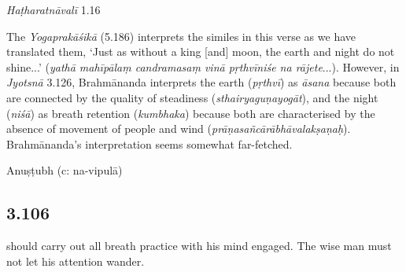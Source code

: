 \begin{ekdosis}


\begin{testimonia}[hp03_105]
\emph{Haṭharatnāvalī} 1.16
\begin{versinnote}
\end{versinnote}

\end{testimonia}

\begin{philcomm}[hp03_105]
The \emph{Yogaprakāśikā} (5.186) interprets the similes in this verse as we have translated them, `Just as without a king [and] moon, the earth and night do not shine...' (\emph{yathā mahīpālaṃ candramasaṃ vinā pṛthvīniśe na rājete}...). However, in \emph{Jyotsnā} 3.126, Brahmānanda interprets the earth (\emph{pṛthvī}) as \emph{āsana} because both are connected by the quality of steadiness (\emph{sthairyaguṇayogāt}), and the night (\emph{niśā}) as breath retention (\emph{kumbhaka}) because both are characterised by the absence of movement of people and wind (\emph{prāṇasañcārābhāvalakṣaṇaḥ}). Brahmānanda's interpretation seems somewhat far-fetched. 
\end{philcomm}

\begin{metre}[hp03_105]
Anuṣṭubh (c: na-vipulā)
\end{metre}

\subsection*{3.106}
\begin{translation} should carry out all breath practice with his mind engaged. The wise man must not let his attention wander.
\end{translation}



\end{ekdosis}
